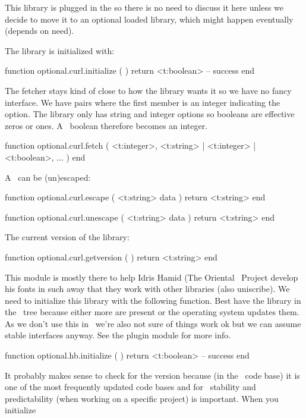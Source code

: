 This library is plugged in the  so there is no need to discuss it
here unless we decide to move it to an optional loaded library, which might
happen eventually (depends on need).

\stopsubsubsubject

\startsubsubsubject[title=curl]

The library is initialized with:

\starttyping[option=LUA]
function optional.curl.initialize ( )
    return <t:boolean> -- success
end
\stoptyping

The fetcher stays kind of close to how the library wants it so we have no fancy
interface. We have pairs where the first member is an integer indicating the
option. The library only has string and integer options so booleans are effective
zeros or ones. A \LUA\ boolean therefore becomes an integer.

\starttyping[option=LUA]
function optional.curl.fetch (
    {
        <t:integer>, <t:string> | <t:integer> | <t:boolean>,
        ...
    }
)
end
\stoptyping

A \URL\ can be (un)escaped:

\starttyping[option=LUA]
function optional.curl.escape ( <t:string> data )
    return <t:string>
end

function optional.curl.unescape ( <t:string> data )
    return <t:string>
end
\stoptyping

The current version of the library:

\starttyping[option=LUA]
function optional.curl.getversion ( )
    return <t:string>
end
\stoptyping

\stopsubsubsubject

\startsubsubsubject[title=hb]

This module is mostly there to help Idris Hamid (The Oriental \TEX\ Project
develop his fonts in such away that they work with other libraries (also
uniscribe). We need to initialize this library with the following function. Best
have the library in the \TEX\ tree because either more are present or the
operating system updates them. As we don't use this in \CONTEXT\ we're also not
sure of things work ok but we can assume stable interfaces anyway. See the plugin
module for more info.

\starttyping[option=LUA]
function optional.hb.initialize ( )
    return <t:boolean> -- success
end
\stoptyping

It probably makes sense to check for the version because (in the \TEXLIVE\ code
base) it is one of the most frequently updated code bases and for \TEX\ stability
and predictability (when working on a specific project) is important. When you
initialize

